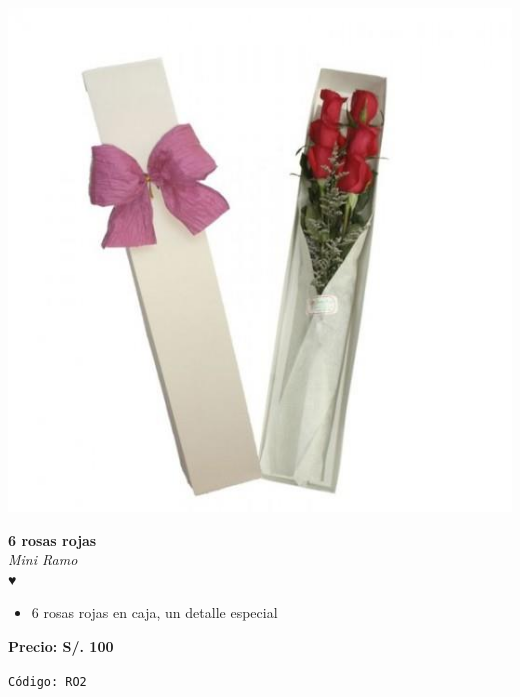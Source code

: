 \documentclass[12pt]{article}
\begin{document}
\vspace{1cm}
\noindent
\begin{minipage}{0.35\textwidth}
    \includegraphics[width=1.0\textwidth]{imagenes_extraidas/image_5_4}
\end{minipage}
\hspace{1cm}
\begin{minipage}{0.6\textwidth}
    \textcolor[HTML]{FF8C00}{\textbf{\huge 6 rosas rojas }}\\
    {\textit{Mini Ramo}} \\
    \textcolor[HTML]{FF8C00}{\Huge ♥} \\
    \vspace{0.5cm}
    \begin{itemize}
        \item 6 rosas rojas en caja, un detalle especial
    \end{itemize}
\end{minipage}
\vspace{0.3cm}
\begin{center}
   \textbf{\Large Precio: \textcolor[HTML]{228B22}{S/. 100 }}
\end{center}
\begin{center}
    \textcolor[HTML]{191970}{\texttt{Código: RO2}}
\end{center}
\vspace{1cm}
\end{document}

